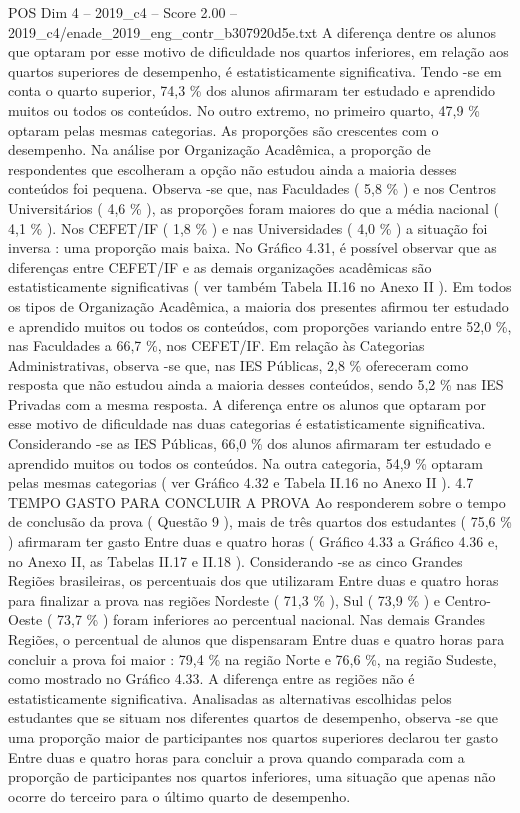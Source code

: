 \begin{textsample}{POS Dim 4 – 2019\_c4 – Score 2.00 – 2019\_c4/enade\_2019\_eng\_contr\_b307920d5e.txt}
A diferença dentre os alunos que optaram por esse motivo de dificuldade nos quartos inferiores, em relação aos quartos superiores de desempenho, é estatisticamente significativa.
Tendo -se em conta o quarto superior, 74,3 \% dos alunos afirmaram ter estudado e aprendido muitos ou todos os conteúdos.
No outro extremo, no primeiro quarto, 47,9 \% optaram pelas mesmas categorias.
As proporções são crescentes com o desempenho.
Na análise por Organização Acadêmica, a proporção de respondentes que escolheram a opção não estudou ainda a maioria desses conteúdos foi pequena.
Observa -se que, nas Faculdades ( 5,8 \% ) e nos Centros Universitários ( 4,6 \% ), as proporções foram maiores do que a média nacional ( 4,1 \% ).
Nos CEFET/IF ( 1,8 \% ) e nas Universidades ( 4,0 \% ) a situação foi inversa : uma proporção mais baixa.
No Gráfico 4.31, é possível observar que as diferenças entre CEFET/IF e as demais organizações acadêmicas são estatisticamente significativas ( ver também Tabela II.16 no Anexo II ).
Em todos os tipos de Organização Acadêmica, a maioria dos presentes afirmou ter estudado e aprendido muitos ou todos os conteúdos, com proporções variando entre 52,0 \%, nas Faculdades a 66,7 \%, nos CEFET/IF.
Em relação às Categorias Administrativas, observa -se que, nas IES Públicas, 2,8 \% ofereceram como resposta que não estudou ainda a maioria desses conteúdos, sendo 5,2 \% nas IES Privadas com a mesma resposta.
A diferença entre os alunos que optaram por esse motivo de dificuldade nas duas categorias é estatisticamente significativa.
Considerando -se as IES Públicas, 66,0 \% dos alunos afirmaram ter estudado e aprendido muitos ou todos os conteúdos.
Na outra categoria, 54,9 \% optaram pelas mesmas categorias ( ver Gráfico 4.32 e Tabela II.16 no Anexo II ). 4.7 TEMPO GASTO PARA CONCLUIR A PROVA Ao responderem sobre o tempo de conclusão da prova ( Questão 9 ), mais de três quartos dos estudantes ( 75,6 \% ) afirmaram ter gasto Entre duas e quatro horas ( Gráfico 4.33 a Gráfico 4.36 e, no Anexo II, as Tabelas II.17 e II.18 ).
Considerando -se as cinco Grandes Regiões brasileiras, os percentuais dos que utilizaram Entre duas e quatro horas para finalizar a prova nas regiões Nordeste ( 71,3 \% ), Sul ( 73,9 \% ) e Centro-Oeste ( 73,7 \% ) foram inferiores ao percentual nacional.
Nas demais Grandes Regiões, o percentual de alunos que dispensaram Entre duas e quatro horas para concluir a prova foi maior : 79,4 \% na região Norte e 76,6 \%, na região Sudeste, como mostrado no Gráfico 4.33.
A diferença entre as regiões não é estatisticamente significativa.
Analisadas as alternativas escolhidas pelos estudantes que se situam nos diferentes quartos de desempenho, observa -se que uma proporção maior de participantes nos quartos superiores declarou ter gasto Entre duas e quatro horas para concluir a prova quando comparada com a proporção de participantes nos quartos inferiores, uma situação que apenas não ocorre do terceiro para o último quarto de desempenho.

\end{textsample}
